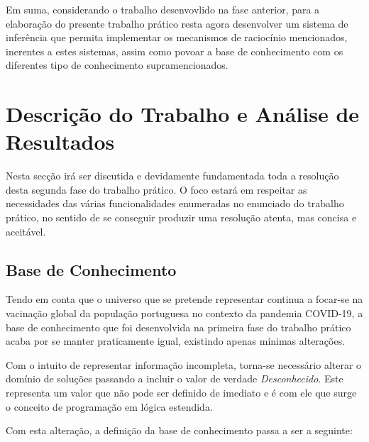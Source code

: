 \documentclass[a4paper, 11pt]{article}
\begin{document}
Em suma, considerando o trabalho desenvovlido na fase anterior, para a elaboração do presente 
trabalho prático resta agora desenvolver um
sistema de inferência que permita implementar os
mecanismos de raciocínio mencionados, inerentes a estes sistemas, assim como povoar a base de 
conhecimento com os diferentes tipo de conhecimento supramencionados.

\pagebreak

\section{Descrição do Trabalho e Análise de Resultados}

Nesta secção irá ser discutida e devidamente fundamentada toda a resolução desta segunda fase 
do trabalho prático. O foco estará em respeitar as necessidades das várias funcionalidades 
enumeradas no enunciado do trabalho prático, no sentido de se conseguir produzir uma resolução 
atenta, mas
concisa e aceitável.

\subsection{Base de Conhecimento}

Tendo em conta que o universo que se pretende representar continua a focar-se na vacinação global 
da população portuguesa no contexto da pandemia COVID-19, a base de conhecimento que foi 
desenvolvida
na primeira fase do trabalho prático acaba por se manter
praticamente igual, existindo apenas mínimas alterações.

Com o intuito de representar informação incompleta, torna-se necessário alterar o domínio de 
soluções passando a incluir o valor de verdade \textit{Desconhecido}. Este
representa um valor que não pode ser definido de imediato e é com ele que surge o
conceito de programação em lógica estendida.

Com esta alteração, a definição da base de conhecimento passa a ser a seguinte:
\end{document}
